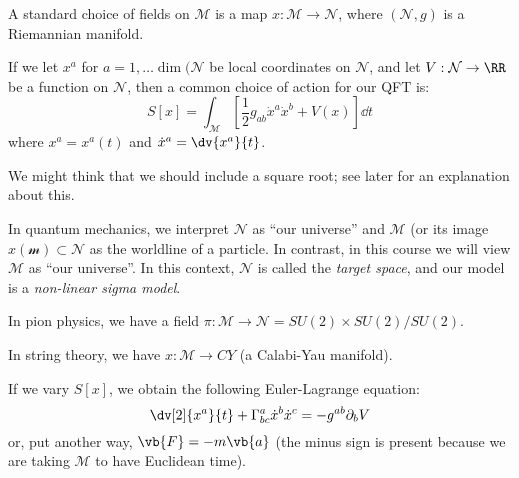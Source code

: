 \documentclass{jknotes}
\begin{document}
A standard choice of fields on \(\mathcal{M}\) is a map \(x:\mathcal{M}\to\mathcal{N}\), where \((\mathcal{N},g)\) is a Riemannian manifold.
\begin{figure}[H]
    \centering
\end{figure}
If we let \(x^a\) for \(a = 1,\dots\dim(\mathcal{N}\) be local coordinates on \(\mathcal{N}\), and let \(V:\mathcal{N}\to\RR\) be a function on \(\mathcal{N}\), then a common choice of action for our QFT is:
\begin{equation}
    S[x] = \int_\mathcal{M}\left[ \frac{1}{2}g_{ab}\dot{x}^a\dot{x}^b + V(x) \right]\dd{t}
\end{equation}
where \(x^a = x^a(t)\) and \(\dot{x}^a = \dv{x^a}{t}\).

We might think that we should include a square root; see later for an explanation about this.

In quantum mechanics, we interpret \(\mathcal{N}\) as ``our universe'' and \(\mathcal{M}\) (or its image \(x(\mathcal{m})\subset\mathcal{N}\) as the worldline of a particle. In contrast, in this course we will view \(\mathcal{M}\) as ``our universe''. In this context, \(\mathcal{N}\) is called the \emph{target space}, and our model is a \emph{non-linear sigma model}.
\begin{eg}
    In pion physics, we have a field \(\pi:\mathcal{M}\to\mathcal{N} = SU(2)\times SU(2)/SU(2)\).
\end{eg}
\begin{eg}
    In string theory, we have \(x:\mathcal{M}\to CY\) (a Calabi-Yau manifold).
\end{eg}

If we vary \(S[x]\), we obtain the following Euler-Lagrange equation:
\begin{equation}
    \dv[2]{x^a}{t} + \Gamma^a_{bc}\dot{x}^b\dot{x}^c = - g^{ab}\partial_bV
\end{equation}
or, put another way, \(\vb{F} = -m\vb{a}\) (the minus sign is present because we are taking \(\mathcal{M}\) to have Euclidean time).
\end{document}
